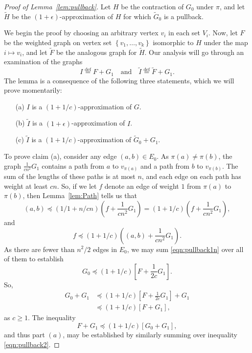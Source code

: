 \documentclass[11pt]{article}
\def\Htil{\widetilde{H}}
\def\Itil{\widetilde{I}}
\def\Gtil{\widetilde{G}}
\def\Ftil{\widetilde{F}}
\def\pleq{\preccurlyeq}
\def\defeq{\stackrel{\mathrm{def}}{=}}
\def\setof#1{\left\{#1  \right\}}
\def\pleq{\preccurlyeq}
\def\setof#1{\left\{#1  \right\}}
\begin{document}
\begin{proof}[Proof of Lemma~\ref{lem:pullback}]
Let $H$ be the contraction of $G_{0}$ under $\pi$,
  and let $\Htil$ be the $(1+\epsilon)$-approximation of $H$
  for which $\Gtil_{0}$ is a pullback.

We begin the proof by choosing an arbitrary vertex $v_{i}$ in each set $V_{i}$.
Now, let $F$ be the weighted
  graph on vertex set $\setof{v_{1}, \dotsc , v_{k}}$
  isomorphic to $H$ under the map $i \mapsto v_{i}$,
 and let $\Ftil$ be the analogous graph for $\Htil$.
Our analysis will go through an examination of the graphs
\[
  I \defeq F + G_{1} \quad \text{and} \quad
  \Itil \defeq \Ftil + G_{1}.
\]
The lemma is a consequence of the following three statements,
  which we will prove momentarily:
\begin{itemize}
\item [(a)] $I$ is a $(1+1/c)$-approximation of $G$.
\item [(b)] $\Itil$ is a $(1+\epsilon)$-approximation of $I$.
\item [(c)] $\Itil$ is a $(1+1/c)$-approximation of $\Gtil_{0} + G_{1}$.
\end{itemize}
To prove claim (a), consider any edge $(a,b) \in E_{0}$.
As $\pi (a) \not = \pi (b)$, the graph
  $\frac{1}{c n^{2}}G_{1}$ contains a path from
  $a$ to $v_{\pi (a)}$ and a path from $b$ to $v_{\pi (b)}$.
The sum of the lengths of these paths is at most $n$, and each
  edge on each path has weight at least $c n$.
So, if we let $f$ denote an edge of weight $1$ from
  $\pi (a)$ to $\pi (b)$,
  then Lemma~\ref{lem:Path} tells us that
\begin{equation}\label{eqn:pullback1n}
(a,b) \pleq (1/1 + n / c n) \left(f + \frac{1}{c n^{2}} G_{1} \right)
=
(1+1/c) \left(f + \frac{1}{c n^{2}} G_{1} \right),
\end{equation}
and
\begin{equation}\label{eqn:pullback2}
f \pleq (1+1/c) \left((a,b) + \frac{1}{c n^{2}} G_{1} \right).
\end{equation}
As there are fewer than $n^{2}/2$ edges in $E_{0}$, we may
 sum \eqref{eqn:pullback1n} over all of them 
  to establish
\[
  G_{0}  \pleq (1+1/c) \left[F + \frac{1}{2c} G_{1} \right].
\]
So,
\begin{align*}
  G_{0} + G_{1}
&  \pleq (1+1/c) \left[F + \frac{1}{2c} G_{1} \right] + G_{1}\\
&  \pleq (1+1/c) \left[F + G_{1} \right],
\end{align*}
as $c \geq 1$.
The inequality
\[
F + G_{1} \pleq (1+1/c)\left[ G_{0} + G_{1} \right],
\]
and thus part $(a)$, may be established by similarly summing
  over inequality \eqref{eqn:pullback2}.


\end{proof}
\end{document}
